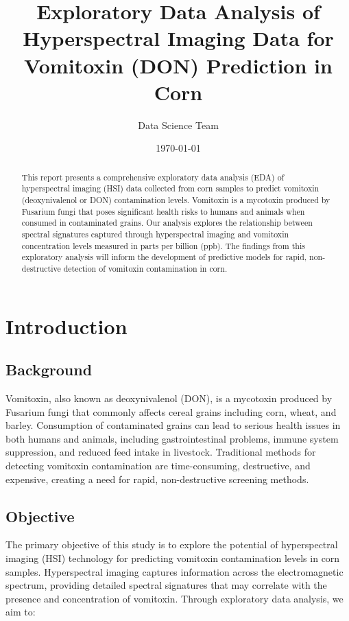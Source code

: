 \documentclass[12pt,a4paper]{article}
\title{\textbf{Exploratory Data Analysis of Hyperspectral Imaging Data for Vomitoxin (DON) Prediction in Corn}}
\author{Data Science Team}
\date{\today}
\begin{document}
\maketitle

\begin{abstract}
This report presents a comprehensive exploratory data analysis (EDA) of hyperspectral imaging (HSI) data collected from corn samples to predict vomitoxin (deoxynivalenol or DON) contamination levels. Vomitoxin is a mycotoxin produced by Fusarium fungi that poses significant health risks to humans and animals when consumed in contaminated grains. Our analysis explores the relationship between spectral signatures captured through hyperspectral imaging and vomitoxin concentration levels measured in parts per billion (ppb). The findings from this exploratory analysis will inform the development of predictive models for rapid, non-destructive detection of vomitoxin contamination in corn.
\end{abstract}

\section{Introduction}

\subsection{Background}
Vomitoxin, also known as deoxynivalenol (DON), is a mycotoxin produced by Fusarium fungi that commonly affects cereal grains including corn, wheat, and barley. Consumption of contaminated grains can lead to serious health issues in both humans and animals, including gastrointestinal problems, immune system suppression, and reduced feed intake in livestock. Traditional methods for detecting vomitoxin contamination are time-consuming, destructive, and expensive, creating a need for rapid, non-destructive screening methods.

\subsection{Objective}
The primary objective of this study is to explore the potential of hyperspectral imaging (HSI) technology for predicting vomitoxin contamination levels in corn samples. Hyperspectral imaging captures information across the electromagnetic spectrum, providing detailed spectral signatures that may correlate with the presence and concentration of vomitoxin. Through exploratory data analysis, we aim to:
\end{document}
